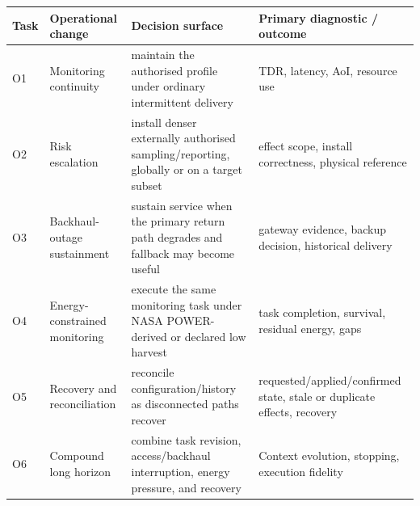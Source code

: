 \begin{tabular}{p{}p{}p{}p{}}
\toprule
Task & Operational change & Decision surface & Primary diagnostic / outcome \\
\midrule
O1 & Monitoring continuity & maintain the authorised profile under ordinary intermittent delivery & TDR, latency, AoI, resource use \\
O2 & Risk escalation & install denser externally authorised sampling/reporting, globally or on a target subset & effect scope, install correctness, physical reference \\
O3 & Backhaul-outage sustainment & sustain service when the primary return path degrades and fallback may become useful & gateway evidence, backup decision, historical delivery \\
O4 & Energy-constrained monitoring & execute the same monitoring task under NASA POWER-derived or declared low harvest & task completion, survival, residual energy, gaps \\
O5 & Recovery and reconciliation & reconcile configuration/history as disconnected paths recover & requested/applied/confirmed state, stale or duplicate effects, recovery \\
O6 & Compound long horizon & combine task revision, access/backhaul interruption, energy pressure, and recovery & Context evolution, stopping, execution fidelity \\
\bottomrule
\end{tabular}
